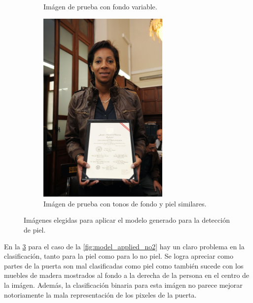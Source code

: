 \begin{figure}[ht!]
\begin{subfigure}[t]{0.4\textwidth}
        \caption{Imágen de prueba con fondo variable.}
        \label{fig:imagen_prueba_no6}
    \end{subfigure}
    \begin{subfigure}{0.4\textwidth}
        \centering
        \includegraphics[width=0.7\textwidth]{../figures/image2/image_02.png}
        \caption{Imágen de prueba con tonos de fondo y piel similares.}
        \label{fig:imagen_prueba_no2}
    \end{subfigure}
    \caption{Imágenes elegidas para aplicar el modelo generado para la detección de piel.}
\end{figure}

En la \cref{fig:imagen_prueba_no2} para el caso de la \cref{fig:model_applied_no2} hay un claro problema en la clasificación, tanto para la piel como para lo no piel. Se logra apreciar como partes de la puerta son mal clasificadas como piel como también sucede con los muebles de madera mostrados al fondo a la derecha de la persona en el centro de la imágen. Además, la clasificación binaria para esta imágen no parece mejorar notoriamente la mala representación de los pixeles de la puerta.

